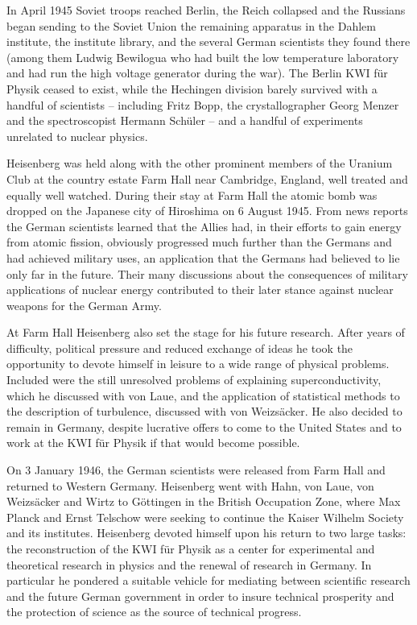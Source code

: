 \documentclass{article}
\begin{document}
In April 1945 Soviet troops reached Berlin, the Reich collapsed and the Russians began sending to the Soviet Union the remaining apparatus in the Dahlem institute, the institute library, and the several German scientists they found there (among them Ludwig Bewilogua who had built the low temperature laboratory and had run the high voltage generator during the war). The Berlin KWI für Physik ceased to exist, while the Hechingen division barely survived with a handful of scientists – including Fritz Bopp, the crystallographer Georg Menzer and the spectroscopist Hermann Schüler – and a handful of experiments unrelated to nuclear physics.

Heisenberg was held along with the other prominent members of the Uranium Club at the country estate Farm Hall near Cambridge, England, well treated and equally well watched. During their stay at Farm Hall the atomic bomb was dropped on the Japanese city of Hiroshima on 6 August 1945. From news reports the German scientists learned that the Allies had, in their efforts to gain energy from atomic fission, obviously progressed much further than the Germans and had achieved military uses, an application that the Germans had believed to lie only far in the future. Their many discussions about the consequences of military applications of nuclear energy contributed to their later stance against nuclear weapons for the German Army.

At Farm Hall Heisenberg also set the stage for his future research. After years of difficulty, political pressure and reduced exchange of ideas he took the opportunity to devote himself in leisure to a wide range of physical problems. Included were the still unresolved problems of explaining superconductivity, which he discussed with von Laue, and the application of statistical methods to the description of turbulence, discussed with von Weizsäcker. He also decided to remain in Germany, despite lucrative offers to come to the United States and to work at the KWI für Physik if that would become possible.

On 3 January 1946, the German scientists were released from Farm Hall and returned to Western Germany. Heisenberg went with Hahn, von Laue, von Weizsäcker and Wirtz to Göttingen in the British Occupation Zone, where Max Planck and Ernst Telschow were seeking to continue the Kaiser Wilhelm Society and its institutes. Heisenberg devoted himself upon his return to two large tasks: the reconstruction of the KWI für Physik as a center for experimental and theoretical research in physics and the renewal of research in Germany. In particular he pondered a suitable vehicle for mediating between scientific research and the future German government in order to insure technical prosperity and the protection of science as the source of technical progress.
\end{document}
